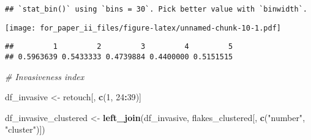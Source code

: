 \documentclass[]{article}
\newenvironment{Shaded}{\begin{snugshade}}{\end{snugshade}}
\newcommand{\KeywordTok}[1]{\textcolor[rgb]{0.13,0.29,0.53}{\textbf{#1}}}
\newcommand{\DataTypeTok}[1]{\textcolor[rgb]{0.13,0.29,0.53}{#1}}
\newcommand{\DecValTok}[1]{\textcolor[rgb]{0.00,0.00,0.81}{#1}}
\newcommand{\StringTok}[1]{\textcolor[rgb]{0.31,0.60,0.02}{#1}}
\newcommand{\CommentTok}[1]{\textcolor[rgb]{0.56,0.35,0.01}{\textit{#1}}}
\newcommand{\OtherTok}[1]{\textcolor[rgb]{0.56,0.35,0.01}{#1}}
\newcommand{\OperatorTok}[1]{\textcolor[rgb]{0.81,0.36,0.00}{\textbf{#1}}}
\newcommand{\NormalTok}[1]{#1}
\begin{document}
\begin{Shaded}
\end{Shaded}

\begin{verbatim}
## `stat_bin()` using `bins = 30`. Pick better value with `binwidth`.
\end{verbatim}

\texttt{[image: for\_paper\_ii\_files/figure-latex/unnamed-chunk-10-1.pdf]}

\begin{Shaded}
\end{Shaded}

\begin{verbatim}
##         1         2         3         4         5 
## 0.5963639 0.5433333 0.4739884 0.4400000 0.5151515
\end{verbatim}

\begin{Shaded}
\begin{Highlighting}[]
\CommentTok{# Invasiveness index}

\NormalTok{df_invasive <-}\StringTok{ }\NormalTok{retouch[, }\KeywordTok{c}\NormalTok{(}\DecValTok{1}\NormalTok{, }\DecValTok{24}\OperatorTok{:}\DecValTok{39}\NormalTok{)]}

\NormalTok{df_invasive_clustered <-}\StringTok{ }\KeywordTok{left_join}\NormalTok{(df_invasive, flakes_clustered[, }\KeywordTok{c}\NormalTok{(}\StringTok{"number"}\NormalTok{, }\StringTok{"cluster"}\NormalTok{)])}
\end{Highlighting}
\end{Shaded}
\end{document}
